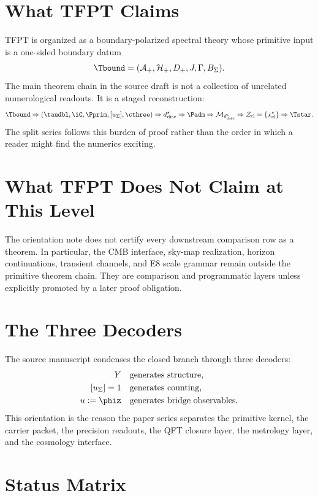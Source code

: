 \tableofcontents

\section{What TFPT Claims}

TFPT is organized as a boundary-polarized spectral theory whose primitive input is a one-sided
boundary datum
\[
\Tbound=(\mathcal A_+,\mathcal H_+,D_+,J,\Gamma,B_\Sigma).
\]
The main theorem chain in the source draft is not a collection of unrelated numerological
readouts. It is a staged reconstruction:
\[
\Tbound
\Rightarrow
(\taudbl,\iC,\Pprim,[u_\Sigma],\cthree)
\Rightarrow
d^\star_{\mathrm{disc}}
\Rightarrow
\Padm
\Rightarrow
\mathcal M_{d^\star_{\mathrm{disc}}}
\Rightarrow
\mathcal Z_{\mathrm{cl}}=\{x^\star_{\mathrm{cl}}\}
\Rightarrow
\Tstar .
\]
The split series follows this burden of proof rather than the order in which a reader might find
the numerics exciting.

\section{What TFPT Does Not Claim at This Level}

The orientation note does not certify every downstream comparison row as a theorem. In particular,
the CMB interface, sky-map realization, horizon continuations, transient channels, and E8 scale
grammar remain outside the primitive theorem chain. They are comparison and programmatic layers
unless explicitly promoted by a later proof obligation.

\section{The Three Decoders}

The source manuscript condenses the closed branch through three decoders:
\[
\begin{aligned}
Y&\quad\text{generates structure},\\
[u_\Sigma]=1&\quad\text{generates counting},\\
u:=\phiz&\quad\text{generates bridge observables}.
\end{aligned}
\]
This orientation is the reason the paper series separates the primitive kernel, the carrier
packet, the precision readouts, the QFT closure layer, the metrology layer, and the cosmology
interface.

\section{Status Matrix}

